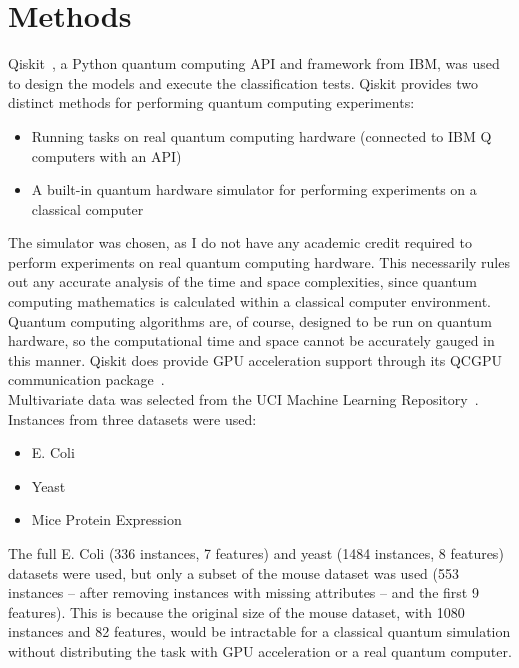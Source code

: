 \documentclass{article}
\begin{document}
\section{Methods}
  Qiskit~\cite{ibm}, a Python quantum computing API and framework from IBM, was used to design the models and execute the classification tests. Qiskit provides two distinct methods for performing quantum computing experiments:

    \begin{itemize}
      \item{Running tasks on real quantum computing hardware (connected to IBM Q computers with an API)}
      \item{A built-in quantum hardware simulator for performing experiments on a classical computer}
    \end{itemize}

  The simulator was chosen, as I do not have any academic credit required to perform experiments on real quantum computing hardware. This necessarily rules out any accurate analysis of the time and space complexities, since quantum computing mathematics is calculated within a classical computer environment. Quantum computing algorithms are, of course, designed to be run on quantum hardware, so the computational time and space cannot be accurately gauged in this manner. Qiskit does provide GPU acceleration support through its QCGPU communication package~\cite{qcgpu}. \\

  Multivariate data was selected from the UCI Machine Learning Repository~\cite{uci}. Instances from three datasets were used:

    \begin{itemize}
      \item E. Coli~\cite{ecoli}
      \item Yeast~\cite{yeast}
      \item Mice Protein Expression~\cite{mouse}
    \end{itemize}

  The full E. Coli (336 instances, 7 features) and yeast (1484 instances, 8 features) datasets were used, but only a subset of the mouse dataset was used (553 instances -- after removing instances with missing attributes -- and the first 9 features). This is because the original size of the mouse dataset, with 1080 instances and 82 features, would be intractable for a classical quantum simulation without distributing the task with GPU acceleration or a real quantum computer. \\
\end{document}
